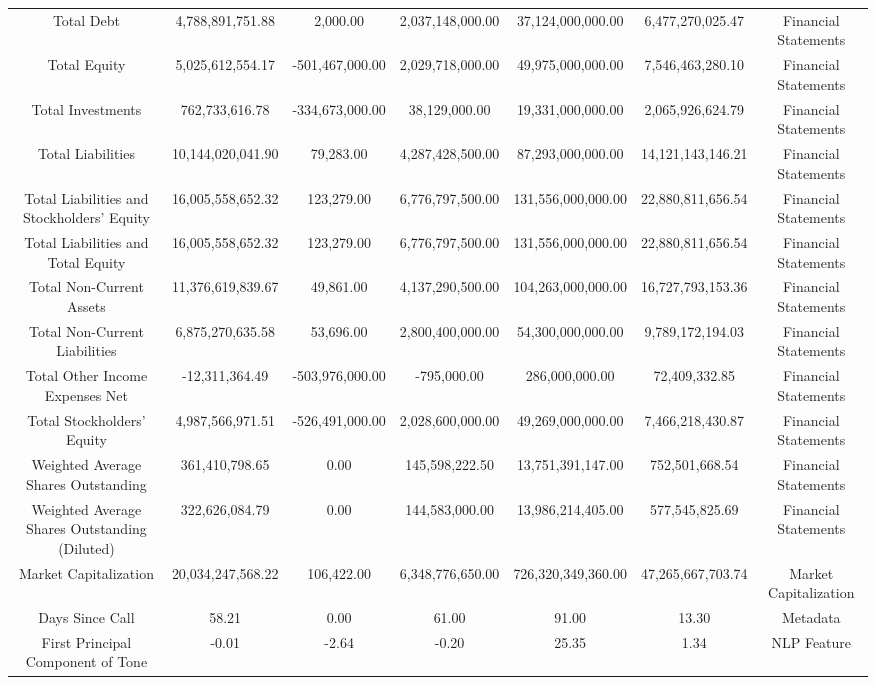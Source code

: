 \begin{longtable}{ccccccc}
Total Debt & 4,788,891,751.88 & 2,000.00 & 2,037,148,000.00 & 37,124,000,000.00 & 6,477,270,025.47 & Financial Statements \\
Total Equity & 5,025,612,554.17 & -501,467,000.00 & 2,029,718,000.00 & 49,975,000,000.00 & 7,546,463,280.10 & Financial Statements \\
Total Investments & 762,733,616.78 & -334,673,000.00 & 38,129,000.00 & 19,331,000,000.00 & 2,065,926,624.79 & Financial Statements \\
Total Liabilities & 10,144,020,041.90 & 79,283.00 & 4,287,428,500.00 & 87,293,000,000.00 & 14,121,143,146.21 & Financial Statements \\
Total Liabilities and Stockholders' Equity & 16,005,558,652.32 & 123,279.00 & 6,776,797,500.00 & 131,556,000,000.00 & 22,880,811,656.54 & Financial Statements \\
Total Liabilities and Total Equity & 16,005,558,652.32 & 123,279.00 & 6,776,797,500.00 & 131,556,000,000.00 & 22,880,811,656.54 & Financial Statements \\
Total Non-Current Assets & 11,376,619,839.67 & 49,861.00 & 4,137,290,500.00 & 104,263,000,000.00 & 16,727,793,153.36 & Financial Statements \\
Total Non-Current Liabilities & 6,875,270,635.58 & 53,696.00 & 2,800,400,000.00 & 54,300,000,000.00 & 9,789,172,194.03 & Financial Statements \\
Total Other Income Expenses Net & -12,311,364.49 & -503,976,000.00 & -795,000.00 & 286,000,000.00 & 72,409,332.85 & Financial Statements \\
Total Stockholders' Equity & 4,987,566,971.51 & -526,491,000.00 & 2,028,600,000.00 & 49,269,000,000.00 & 7,466,218,430.87 & Financial Statements \\
Weighted Average Shares Outstanding & 361,410,798.65 & 0.00 & 145,598,222.50 & 13,751,391,147.00 & 752,501,668.54 & Financial Statements \\
Weighted Average Shares Outstanding (Diluted) & 322,626,084.79 & 0.00 & 144,583,000.00 & 13,986,214,405.00 & 577,545,825.69 & Financial Statements \\
Market Capitalization & 20,034,247,568.22 & 106,422.00 & 6,348,776,650.00 & 726,320,349,360.00 & 47,265,667,703.74 & Market Capitalization \\
Days Since Call & 58.21 & 0.00 & 61.00 & 91.00 & 13.30 & Metadata \\
First Principal Component of Tone & -0.01 & -2.64 & -0.20 & 25.35 & 1.34 & NLP Feature \\

\end{longtable}
